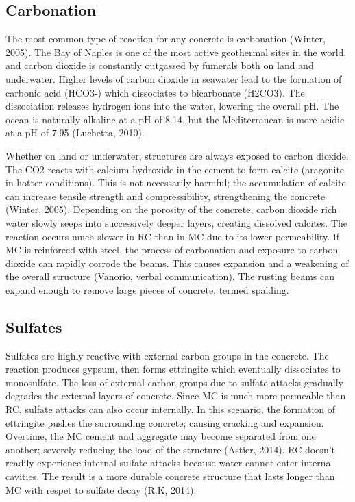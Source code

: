 \documentclass[12pt]{article}
\begin{document}
\subsection*{Carbonation}

The most common type of reaction for any concrete is carbonation (Winter, 2005). The Bay of Naples is one of the most active geothermal sites in the world, and carbon dioxide is constantly outgassed by fumerals both on land and underwater. Higher levels of carbon dioxide in seawater lead to the formation of carbonic acid (HCO3-) which dissociates to bicarbonate (H2CO3). The dissociation releases hydrogen ions into the water, lowering the overall pH. The ocean is naturally alkaline at a pH of 8.14, but the Mediterranean is more acidic at a pH of 7.95 (Luchetta, 2010).

Whether on land or underwater, structures are always exposed to carbon dioxide. The CO2 reacts with calcium hydroxide in the cement to form calcite (aragonite in hotter conditions). This is not necessarily harmful; the accumulation of calcite can increase tensile strength and compressibility, strengthening the concrete (Winter, 2005). Depending on the porosity of the concrete, carbon dioxide rich water slowly seeps into successively deeper layers, creating dissolved calcites. The reaction occurs much slower in RC than in MC due to its lower permeability. If MC is reinforced with steel, the process of carbonation and exposure to carbon dioxide can rapidly corrode the beams. This causes expansion and a weakening of the overall structure (Vanorio, verbal communication). The rusting beams can expand enough to remove large pieces of concrete, termed spalding. 

\subsection*{Sulfates}

Sulfates are highly reactive with external carbon groups in the concrete. The reaction produces gypsum, then forms ettringite which eventually dissociates to monosulfate. The loss of external carbon groups due to sulfate attacks gradually degrades the external layers of concrete. Since MC is much more permeable than RC, sulfate attacks can also occur internally. In this scenario, the formation of ettringite pushes the surrounding concrete; causing cracking and expansion. Overtime, the MC cement and aggregate may become separated from one another; severely reducing the load of the structure (Astier, 2014). RC doesn’t readily experience internal sulfate attacks because water cannot enter internal cavities. The result is a more durable concrete structure that lasts longer than MC with respet to sulfate decay (R.K, 2014).
\end{document}

